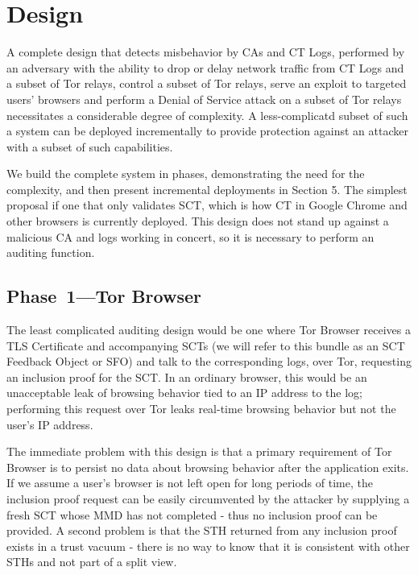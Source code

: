 \section{Design} \label{sec:base}

A complete design that detects misbehavior by CAs and CT Logs, performed by an adversary with the ability to drop or delay network traffic from CT Logs and a subset of Tor relays, control a subset of Tor relays, serve an exploit to targeted users' browsers and perform a Denial of Service attack on a subset of Tor relays necessitates a considerable degree of complexity. A less-complicatd subset of such a system can be deployed incrementally to provide protection against an attacker with a subset of such capabilities.

We build the complete system in phases, demonstrating the need for the complexity, and then present incremental deployments in Section 5. The simplest proposal if one that only validates SCT, which is how CT in Google Chrome and other browsers is currently deployed. This design does not stand up against a malicious CA and logs working in concert, so it is necessary to perform an auditing function.

\subsection{Phase~1---Tor Browser} \label{sec:base:phase1}

The least complicated auditing design would be one where Tor Browser receives a TLS Certificate and accompanying SCTs (we will refer to this bundle as an SCT Feedback Object or SFO) and talk to the corresponding logs, over Tor, requesting an inclusion proof for the SCT. In an ordinary browser, this would be an unacceptable leak of browsing behavior tied to an IP address to the log; performing this request over Tor leaks real-time browsing behavior but not the user's IP address.

The immediate problem with this design is that a primary requirement of Tor Browser is to persist no data about browsing behavior after the application exits. If we assume a user's browser is not left open for long periods of time, the inclusion proof request can be easily circumvented by the attacker by supplying a fresh SCT whose MMD has not completed - thus no inclusion proof can be provided. A second problem is that the STH returned from any inclusion proof exists in a trust vacuum - there is no way to know that it is consistent with other STHs and not part of a split view.

